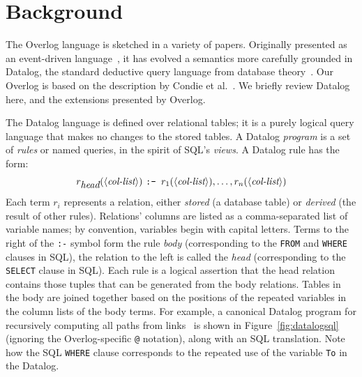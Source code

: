 \section{Background}
\label{sec:jol}
\label{sec:bg}

The Overlog language is sketched in a variety of papers.  Originally
presented as an event-driven language~\cite{p2}, it has evolved a semantics more carefully grounded in Datalog, the standard deductive
query language from database theory~\cite{ullmanbook}.  Our Overlog is
based on the description by Condie et al.~\cite{evitaraced}.  We briefly 
review Datalog here, and the extensions presented by Overlog.

The Datalog language is defined over relational tables; it is a purely logical query language that makes no changes to the stored tables. A Datalog \emph{program} is a set of \emph{rules} or named queries, in the spirit of SQL's \emph{views}.  A Datalog rule has the form:
\[
	r_{\mbox{\em head}}(\langle\mbox{\em col-list}\rangle) \mbox{{ \tt :- }} r_1(\langle\mbox{{\em col-list}}\rangle), \ldots, r_n(\langle\mbox{{\em col-list}}\rangle)
\]
Each term $r_i$ represents a relation, either \emph{stored} (a database table)
or \emph{derived} (the result of other rules).  Relations' columns are listed as
a comma-separated list of variable names; by convention, variables begin with
capital letters.  Terms to the right of the \texttt{:-} symbol form the rule
\emph{body} (corresponding to the {\tt \small FROM} and {\tt \small WHERE}
clauses in SQL), the relation to the left is called the \emph{head}
(corresponding to the {\tt \small SELECT} clause in SQL).  Each rule is a
logical assertion that the head relation contains those tuples that can be
generated from the body relations.  Tables in the body are joined together based
on the positions of the repeated variables in the column lists of the body
terms.  For example, a canonical Datalog program for recursively computing all
paths from links~\cite{loo-sigmod06} is shown in Figure~\ref{fig:datalogsql}
(ignoring the Overlog-specific {\tt @} notation), along with an SQL translation.
Note how the SQL {\tt \small WHERE} clause corresponds to the repeated use of
the variable {\tt \small To} in the Datalog.

